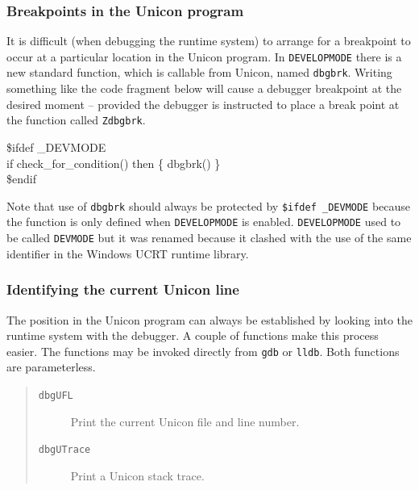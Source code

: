 \subsubsection{Breakpoints in the Unicon program}
It is difficult (when debugging the runtime system) to arrange for a breakpoint
to occur at a particular location in the Unicon program. In \texttt{DEVELOPMODE}
there is a new standard function, which is callable from Unicon, named
\texttt{dbgbrk}. Writing something like the code fragment below will
cause a debugger breakpoint at the desired moment -- provided the debugger is
instructed to place a break point at the function called \texttt{Zdbgbrk}.
\begin{iconcode}
\$ifdef \_DEVMODE\\
\>if check\_for\_condition() then \{ dbgbrk() \}\\
\$endif\\
\end{iconcode}
Note that use of \texttt{dbgbrk} should always be protected by
\texttt{\$ifdef \_DEVMODE} because the function is only defined when
\texttt{DEVELOPMODE} is enabled. \texttt{DEVELOPMODE} used to be called \texttt{DEVMODE}
but it was renamed because it clashed with the use of the same identifier in the Windows
UCRT runtime library.
\subsubsection{Identifying the current Unicon line}
The position in the Unicon program can always be established by looking into the
runtime system with the debugger. A couple of functions make this process
easier. The functions may be invoked directly from \texttt{gdb} or \texttt{lldb}.
Both functions are parameterless.
\begin{quote}
\begin{description}
\item[\texttt{dbgUFL}] Print the current Unicon file and line number.
\item[\texttt{dbgUTrace}] Print a Unicon stack trace.
\end{description}
\end{quote}

